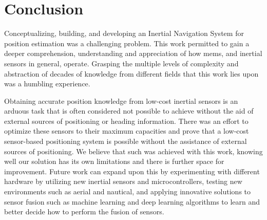 \section{Conclusion}
Conceptualizing, building, and developing an Inertial Navigation System for position estimation was a challenging problem. This work permitted to gain a deeper comprehension, understanding and appreciation of how \acrshort{mems}, and inertial sensors in general, operate. Grasping the multiple levels of complexity and abstraction of decades of knowledge from different fields that this work lies upon was a humbling experience.

Obtaining accurate position knowledge from low-cost inertial sensors is an arduous task that is often considered not possible to achieve without the aid of external sources of positioning or heading information. There was an effort to optimize these sensors to their maximum capacities and prove that a low-cost sensor-based positioning system is possible without the assistance of external sources of positioning. We believe that such was achieved with this work, knowing well our solution has its own limitations and there is further space for improvement. Future work can expand upon this by experimenting with different hardware by utilizing new inertial sensors and microcontrollers, testing new environments such as aerial and nautical, and applying innovative solutions to sensor fusion such as machine learning and deep learning algorithms to learn and better decide how to perform the fusion of sensors.